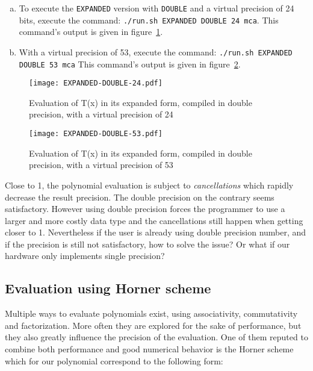 \begin{question}
\begin{enumerate}[(a)]
\item To execute the {\tt EXPANDED} version with {\tt DOUBLE} and a virtual precision of 24 bits, execute the command: {\tt ./run.sh EXPANDED
      DOUBLE 24 mca}. \newline This command's output is given in figure~\ref{fig:expanded:double:24}.
  \item With a virtual precision of 53, execute the command: {\tt ./run.sh EXPANDED DOUBLE 53 mca} \newline
  This command's output is given in figure~\ref{fig:expanded:double:53}.
  \end{enumerate}
\end{question}

\begin{figure}[h]
\center \texttt{[image: EXPANDED-DOUBLE-24.pdf]}
  \caption{Evaluation of T(x) in its expanded form, compiled in double precision, with a virtual precision of 24}
  \label{fig:expanded:double:24}
\end{figure}
\begin{figure}[h]
\center \texttt{[image: EXPANDED-DOUBLE-53.pdf]}
  \caption{Evaluation of T(x) in its expanded form, compiled in double precision, with a virtual precision of 53}
  \label{fig:expanded:double:53}
\end{figure}

Close to 1, the polynomial evaluation is subject to {\it cancellations} which
rapidly decrease the result precision. The double precision on the contrary
seems satisfactory.  However using double precision forces the programmer to
use a larger and more costly data type and the cancellations still happen when
getting closer to 1.  Nevertheless if the user is already using double
precision number, and if the precision is still not satisfactory, how to solve
the issue? Or what if our hardware only implements single precision?

\FloatBarrier

\subsection{Evaluation using Horner scheme}

Multiple ways to evaluate polynomials exist, using associativity, commutativity and factorization. More often they are explored for the sake of performance, but they also greatly influence the precision of the evaluation. One of them reputed to combine both performance and good numerical behavior is the Horner scheme which for our polynomial correspond to the following form:

